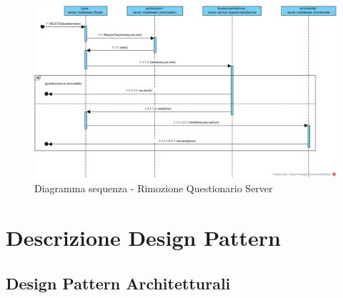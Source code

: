 \documentclass[12pt,a4paper]{article}
\begin{document}
\begin{center}
	\begin{figure}[H]
		\centering \includegraphics[max width=\myheight, angle=90 ]{../img/diagrammiSequenza/rimozioneQuestionarioServer.png}
		\caption{Diagramma sequenza - Rimozione Questionario Server}
	\end{figure}
\end{center}


\newpage
\appendix

\section{Descrizione Design Pattern}
\subsection{Design Pattern Architetturali}
\end{document}
